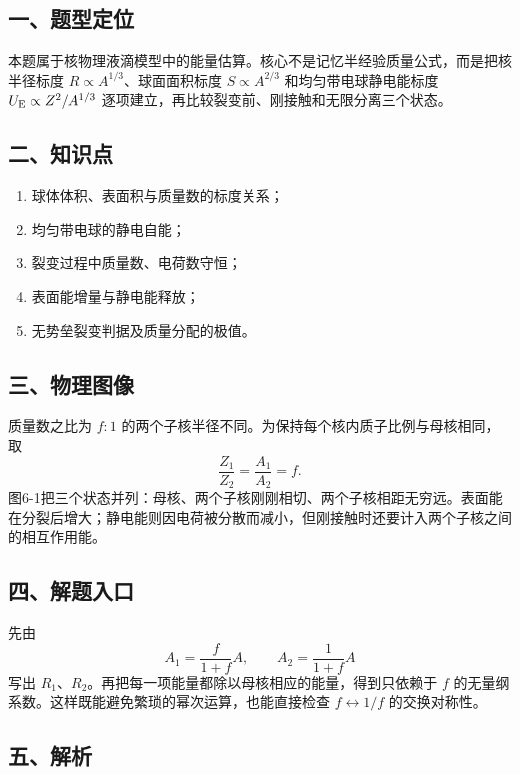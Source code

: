 \documentclass[12pt,a4paper,UTF8]{ctexart}
\newcommand{\tightlist}{\setlength{\itemsep}{0pt}\setlength{\parskip}{0pt}}
\begin{document}
\subsection{一、题型定位}\label{ux4e00ux9898ux578bux5b9aux4f4d-5}

本题属于核物理液滴模型中的能量估算。核心不是记忆半经验质量公式，而是把核半径标度
\(R\propto A^{1/3}\)、球面面积标度 \(S\propto A^{2/3}\)
和均匀带电球静电能标度 \(U_{\rm E}\propto Z^2/A^{1/3}\)
逐项建立，再比较裂变前、刚接触和无限分离三个状态。

\subsection{二、知识点}\label{ux4e8cux77e5ux8bc6ux70b9-5}

\begin{enumerate}
\def\labelenumi{\arabic{enumi}.}
\tightlist
\item
  球体体积、表面积与质量数的标度关系；
\item
  均匀带电球的静电自能；
\item
  裂变过程中质量数、电荷数守恒；
\item
  表面能增量与静电能释放；
\item
  无势垒裂变判据及质量分配的极值。
\end{enumerate}

\subsection{三、物理图像}\label{ux4e09ux7269ux7406ux56feux50cf-5}

质量数之比为 \(f:1\)
的两个子核半径不同。为保持每个核内质子比例与母核相同，取 \[
\frac{Z_1}{Z_2}=\frac{A_1}{A_2}=f.
\]
图6-1把三个状态并列：母核、两个子核刚刚相切、两个子核相距无穷远。表面能在分裂后增大；静电能则因电荷被分散而减小，但刚接触时还要计入两个子核之间的相互作用能。

\subsection{四、解题入口}\label{ux56dbux89e3ux9898ux5165ux53e3-5}

先由 \[
A_1=\frac{f}{1+f}A,
\qquad
A_2=\frac{1}{1+f}A
\] 写出
\(R_1\)、\(R_2\)。再把每一项能量都除以母核相应的能量，得到只依赖于 \(f\)
的无量纲系数。这样既能避免繁琐的幂次运算，也能直接检查
\(f\leftrightarrow1/f\) 的交换对称性。

\subsection{五、解析}\label{ux4e94ux89e3ux6790-5}
\end{document}
